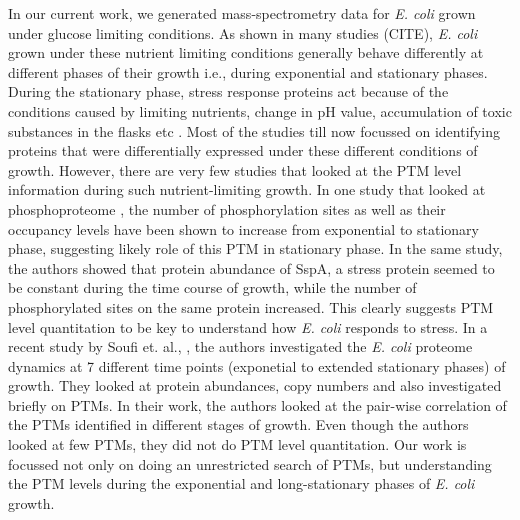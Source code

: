 \documentclass[12pt]{article}
\begin{document}

In our current work, we generated mass-spectrometry data for \emph{E. coli} grown under glucose limiting conditions. As shown in many studies (CITE), \emph{E. coli} grown under these nutrient limiting conditions generally behave differently at different phases of their growth i.e., during exponential and stationary phases. During the stationary phase, stress response proteins act because of the conditions caused by limiting nutrients, change in pH value, accumulation of toxic substances in the flasks etc \cite{Nystrom2004}. Most of the studies till now focussed on identifying proteins that were differentially expressed under these different conditions of growth. However, there are very few studies that looked at the PTM level information during such nutrient-limiting growth. In one study that looked at phosphoproteome \cite{Soaresetal2013}, the number of phosphorylation sites as well as their occupancy levels have been shown to increase from exponential to stationary phase, suggesting likely role of this PTM in stationary phase. In the same study, the authors showed that protein abundance of SspA, a stress protein seemed to be constant during the time course of growth, while the number of phosphorylated sites on the same protein increased. This clearly suggests PTM level quantitation to be key to understand how \emph{E. coli} responds to stress. In a recent study by Soufi et. al., \cite{Soufietal2015}, the authors investigated the \emph{E. coli} proteome dynamics at 7 different time points (exponetial to extended stationary phases) of growth. They looked at protein abundances, copy numbers and also investigated briefly on PTMs. In their work, the authors looked at the pair-wise correlation of the PTMs identified in different stages of growth. Even though the authors looked at few PTMs, they did not do PTM level quantitation. Our work is focussed not only on doing an unrestricted search of PTMs, but understanding the PTM levels during the exponential and long-stationary phases of \emph{E. coli} growth.
\end{document}
